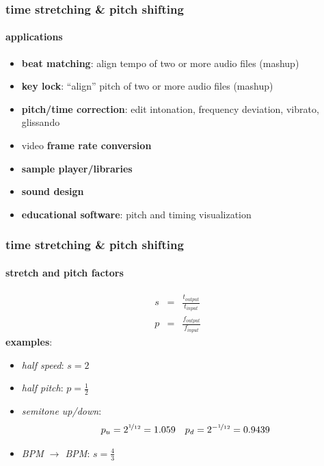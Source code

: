 \begin{frame}\frametitle{time stretching \& pitch shifting}\framesubtitle{applications}
	\begin{itemize}
		\item	\textbf{beat matching}: align tempo of two or more audio files (mashup)
		\pause
        \smallskip
		\item	\textbf{key lock}: ``align'' pitch of two or more audio files (mashup)
		\pause
        \smallskip
		\item	\textbf{pitch/time correction}: edit intonation, frequency deviation, vibrato, glissando
		\pause
        \smallskip
		\item	video \textbf{frame rate conversion}
		\pause
        \smallskip
		\item	\textbf{sample player/libraries}
		\pause
        \smallskip
		\item	\textbf{sound design}
		\pause
        \smallskip
		\item	\textbf{educational software}: pitch and timing visualization
	\end{itemize}
\end{frame}
\begin{frame}\frametitle{time stretching \& pitch shifting}\framesubtitle{stretch and pitch factors}
	\begin{eqnarray*}
		s	&=& \frac{t_{output}}{t_{input}}\\
		p	&=& \frac{f_{output}}{f_{input}}
	\end{eqnarray*}
	\pause
	\textbf{examples}:
	\begin{itemize}
		\item	\textit{half speed}: 
			\pause
			$s = 2$
		\pause
		\item	\textit{half pitch}: 
			\pause
			$p = \frac{1}{2}$
		\pause
		\item	\textit{semitone up/down}: 
			\pause
			\begin{equation}
				p_u = 2^{\nicefrac{1}{12}} = 1.059\quad p_d = 2^{-\nicefrac{1}{12}} = 0.9439\nonumber
			\end{equation}
		\pause
		\item	\textit{\unit[100]{BPM} $\rightarrow$ \unit[75]{BPM}}: 
			\pause
			$s = \frac{4}{3}$
	\end{itemize}
\end{frame}
